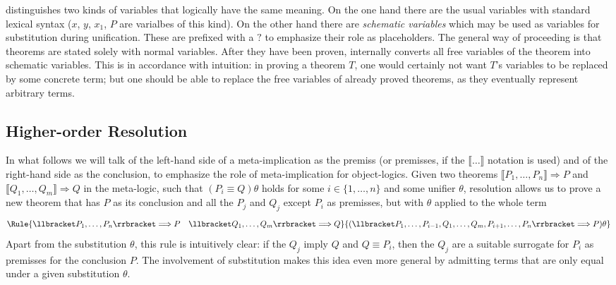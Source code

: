 \begin{rem}
  \Isabelle distinguishes two kinds of variables that logically have the same
  meaning. On the one hand there are the usual variables with standard lexical
  syntax ($x$, $y$, $x_1$, $P$ are varialbes of this kind). On the other hand
  there are \emph{schematic variables} which may be used as variables for
  substitution during unification. These are prefixed with a $?$ to emphasize
  their role as placeholders. The general way of proceeding is that theorems are
  stated solely with normal variables. After they have been proven, \Isabelle
  internally converts all free variables of the theorem into schematic
  variables. This is in accordance with intuition: in proving a theorem $T$, one
  would certainly not want $T$'s variables to be replaced by some concrete term;
  but one should be able to replace the free variables of already proved
  theorems, as they eventually represent arbitrary terms.
\end{rem}



\subsection{Higher-order Resolution}
\label{sec:nat-ded-resolution}

In what follows we will talk of the left-hand side of a meta-implication as the
premiss (or premisses, if the $\llbracket\ldots\rrbracket$ notation is used) and of the right-hand side
as the conclusion, to emphasize the role of meta-implication for object-logics.
Given two theorems $\llbracket P_1,\ldots,P_n\rrbracket \Longrightarrow P$ and $\llbracket Q_1,\ldots,Q_m\rrbracket \Longrightarrow Q$ in the meta-logic,
such that $(P_i \equiv Q)\theta$ holds for some $i\in\{1,\ldots,n\}$ and some unifier $\theta$,
resolution allows us to prove a new theorem that has $P$ as its conclusion and
all the $P_j$ and $Q_j$ except $P_i$ as premisses, but with $\theta$ applied to the
whole term
\begin{equation}
  \Rule{\llbracket P_1,\ldots,P_n\rrbracket \Longrightarrow P \quad \llbracket Q_1, \ldots, Q_m\rrbracket \Longrightarrow Q}
       {(\llbracket P_1,\ldots,P_{i-1},Q_1,\ldots,Q_m,P_{i+1},\ldots,P_n\rrbracket \Longrightarrow P)\theta}
\end{equation}
Apart from the substitution $\theta$, this rule is intuitively clear: if the $Q_j$
imply $Q$ and $Q \equiv P_i$, then the $Q_j$ are a suitable surrogate for $P_i$ as
premisses for the conclusion $P$. The involvement of substitution makes this
idea even more general by admitting terms that are only equal under a given
substitution $\theta$.  

